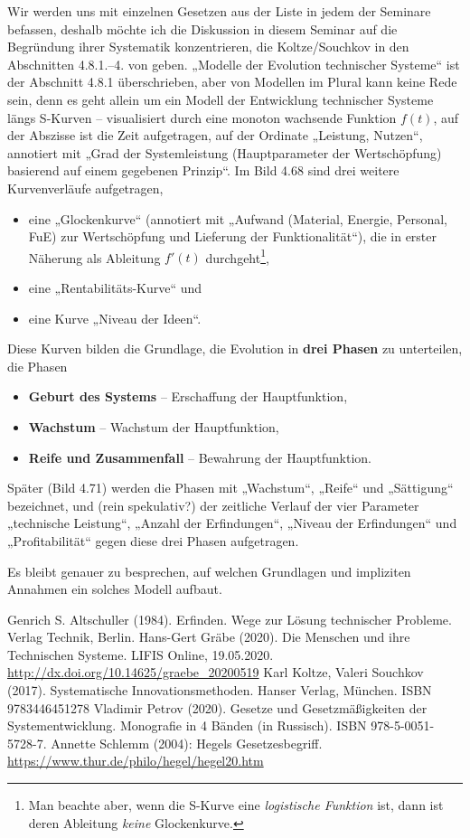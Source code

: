 \documentclass[11pt,a4paper]{article}
\begin{document}
Wir werden uns mit einzelnen Gesetzen aus der Liste in jedem der Seminare
befassen, deshalb möchte ich die Diskussion in diesem Seminar auf die
Begründung ihrer Systematik konzentrieren, die Koltze/Souchkov in den
Abschnitten 4.8.1.--4. von \cite{Koltze2017} geben. „Modelle der Evolution
technischer Systeme“ ist der Abschnitt 4.8.1 überschrieben, aber von Modellen
im Plural kann keine Rede sein, denn es geht allein um ein Modell der
Entwicklung technischer Systeme längs S-Kurven -- visualisiert durch eine
monoton wachsende Funktion $f(t)$, auf der Abszisse ist die Zeit aufgetragen,
auf der Ordinate „Leistung, Nutzen“, annotiert mit „Grad der Systemleistung
(Hauptparameter der Wertschöpfung) basierend auf einem gegebenen Prinzip“. Im
Bild 4.68 sind drei weitere Kurvenverläufe aufgetragen,
\begin{itemize}[noitemsep]
\item eine „Glockenkurve“ (annotiert mit „Aufwand (Material, Energie,
  Personal, FuE) zur Wertschöpfung und Lieferung der Funktionalität“), die in
  erster Näherung als Ableitung $f'(t)$ durchgeht\footnote{Man beachte aber,
    wenn die S-Kurve eine \emph{logistische Funktion} ist, dann ist deren
    Ableitung \emph{keine} Glockenkurve.},
\item eine „Rentabilitäts-Kurve“ und 
\item eine Kurve „Niveau der Ideen“. 
\end{itemize}
Diese Kurven bilden die Grundlage, die Evolution in \textbf{drei Phasen} zu
unterteilen, die Phasen
\begin{itemize}[noitemsep]
\item \textbf{Geburt des Systems} -- Erschaffung der Hauptfunktion,
\item \textbf{Wachstum} -- Wachstum der Hauptfunktion,
\item \textbf{Reife und Zusammenfall} -- Bewahrung der Hauptfunktion. 
\end{itemize}
Später (Bild 4.71) werden die Phasen mit „Wachstum“, „Reife“ und „Sättigung“
bezeichnet, und (rein spekulativ?) der zeitliche Verlauf der vier Parameter
„technische Leistung“, „Anzahl der Erfindungen“, „Niveau der Erfindungen“ und
„Profitabilität“ gegen diese drei Phasen aufgetragen. 

Es bleibt genauer zu besprechen, auf welchen Grundlagen und impliziten
Annahmen ein solches Modell aufbaut.

\begin{thebibliography}{xxx}
 Genrich S. Altschuller (1984).  Erfinden. Wege zur
  Lösung technischer Probleme. Verlag Technik, Berlin. 
 Hans-Gert Gräbe (2020). Die Menschen und ihre Technischen
  Systeme. LIFIS Online, 19.05.2020.
  \url{http://dx.doi.org/10.14625/graebe_20200519}
 Karl Koltze, Valeri Souchkov (2017). Systematische
  Innovationsmethoden.  Hanser Verlag, München. ISBN 9783446451278
 Vladimir Petrov (2020). Gesetze und Gesetzmäßigkeiten
  der Systementwicklung. Monografie in 4 Bänden (in Russisch). ISBN
  978-5-0051-5728-7.
 Annette Schlemm (2004): Hegels Gesetzesbegriff.\\
  \url{https://www.thur.de/philo/hegel/hegel20.htm}
\end{thebibliography}
\end{document}

